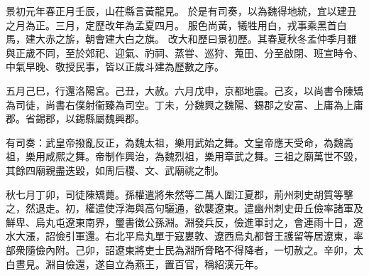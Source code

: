 \begin{pinyinscope}
 
景初元年春正月壬辰，山茌縣言黃龍見。
 於是有司奏，以為魏得地統，宜以建丑之月為正。三月，定歷改年為孟夏四月。
 服色尚黃，犧牲用白，戎事乘黑首白馬，建大赤之旂，朝會建大白之旗。
 改大和歷曰景初歷。其春夏秋冬孟仲季月雖與正歲不同，至於郊祀、迎氣、礿祠、蒸甞、巡狩、蒐田、分至啟閉、班宣時令、中氣早晚、敬授民事，皆以正歲斗建為歷數之序。
 
 
 
 
 五月己巳，行還洛陽宮。己丑，大赦。六月戊申，京都地震。己亥，以尚書令陳矯為司徒，尚書右僕射衞臻為司空。丁未，分魏興之魏陽、錫郡之安富、上庸為上庸郡。省錫郡，以錫縣屬魏興郡。
 
 
有司奏：武皇帝撥亂反正，為魏太祖，樂用武始之舞。文皇帝應天受命，為魏高祖，樂用咸熈之舞。帝制作興治，為魏烈祖，樂用章武之舞。三祖之廟萬世不毀，其餘四廟親盡迭毀，如周后稷、文、武廟祧之制。
 
 
 
 
 秋七月丁卯，司徒陳矯薨。孫權遣將朱然等二萬人圍江夏郡，荊州刺史胡質等擊之，然退走。初，權遣使浮海與高句驪通，欲襲遼東。遣幽州刺史毌丘儉率諸軍及鮮卑、烏丸屯遼東南界，璽書徵公孫淵。淵發兵反，儉進軍討之，會連雨十日，遼水大漲，詔儉引軍還。右北平烏丸單于寇婁敦、遼西烏丸都督王護留等居遼東，率部衆隨儉內附。己卯，詔遼東將吏士民為淵所脅略不得降者，一切赦之。辛卯，太白晝見。淵自儉還，遂自立為燕王，置百官，稱紹漢元年。
 

\end{pinyinscope}
